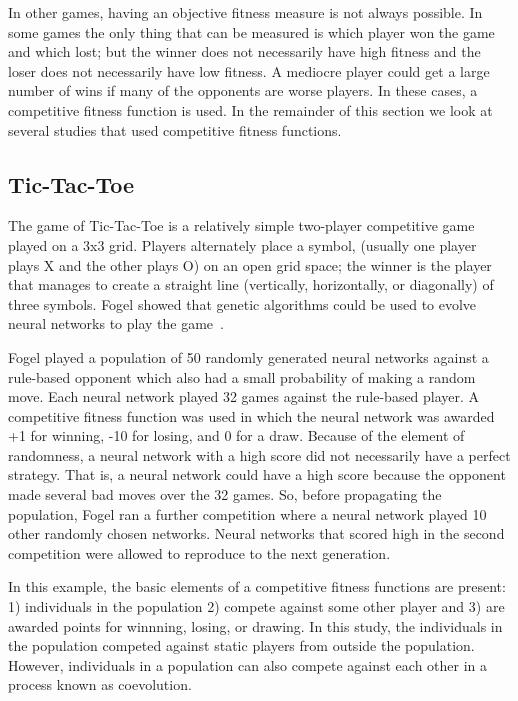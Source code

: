 In other games, having an objective fitness measure is not always possible. In
some games the only thing that can be measured is which player won the game and
which lost; but the winner does not necessarily have high fitness and the loser
does not necessarily have low fitness. A mediocre player could get a large
number of wins if many of the opponents are worse players. In these cases, a
competitive fitness function is used. In the remainder of this section we look
at several studies that used competitive fitness functions.

\subsection{Tic-Tac-Toe}

The game of Tic-Tac-Toe is a relatively simple two-player competitive game
played on a 3x3 grid. Players alternately place a symbol, (usually one player
plays X and the other plays O) on an open grid space; the winner is the player
that manages to create a straight line (vertically, horizontally, or diagonally)
of three symbols. Fogel showed that genetic algorithms could be used to evolve
neural networks to play the game~\cite{Fogel1993}.

Fogel played a population of 50 randomly generated neural networks against a
rule-based opponent which also had a small probability of making a random move.
Each neural network played 32 games against the rule-based player. A competitive
fitness function was used in which the neural network was awarded +1 for
winning, -10 for losing, and 0 for a draw. Because of the element of randomness,
a neural network with a high score did not necessarily have a perfect strategy.
That is, a neural network could have a high score because the opponent made
several bad moves over the 32 games. So, before propagating the population,
Fogel ran a further competition where a neural network played 10 other randomly
chosen networks. Neural networks that scored high in the second competition were
allowed to reproduce to the next generation.

In this example, the basic elements of a competitive fitness functions are
present: 1) individuals in the population 2) compete against some other player
and 3) are awarded points for winnning, losing, or drawing. In this study, the
individuals in the population competed against static players from outside the
population. However, individuals in a population can also compete against each
other in a process known as coevolution.

